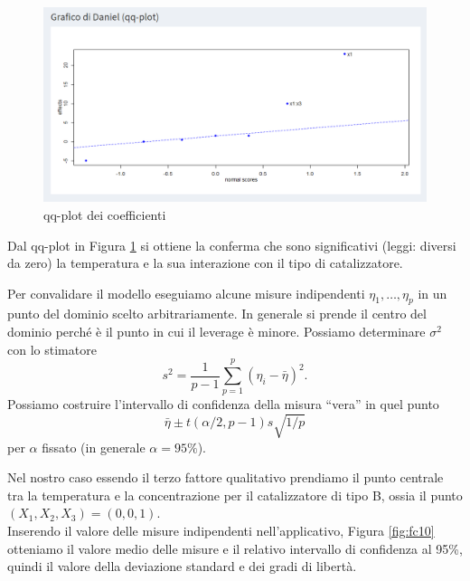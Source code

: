 \documentclass[
  11pt,
]{book}
\begin{document}
\begin{figure}

{\centering \includegraphics[width=1\linewidth]{Immagini/Fatt_compl/09_qqplot} 

}

\caption{qq-plot dei coefficienti}\label{fig:fc9}
\end{figure}

Dal qq-plot in Figura \ref{fig:fc9} si ottiene la conferma che sono
significativi (leggi: diversi da zero) la temperatura e la sua
interazione con il tipo di catalizzatore.

Per convalidare il modello eseguiamo alcune misure indipendenti
\(\eta_1,\dots,\eta_p\) in un punto del dominio scelto arbitrariamente. In
generale si prende il centro del dominio perché è il punto in cui il
leverage è minore. Possiamo determinare \(\sigma^2\) con lo stimatore \[
s^2=\frac{1}{p-1}\sum_{p=1}^p(\eta_i-\bar{\eta})^2.
\] Possiamo costruire l'intervallo di confidenza della misura ``vera'' in
quel punto \[
\bar{\eta}\pm t(\alpha/2,p-1)s\sqrt{1/p}
\] per \(\alpha\) fissato (in generale \(\alpha=95\%\)).

Nel nostro caso essendo il terzo fattore qualitativo prendiamo il punto
centrale tra la temperatura e la concentrazione per il catalizzatore di
tipo B, ossia il punto \((X_1,X_2,X_3)=(0,0,1)\).\\
Inserendo il valore delle misure indipendenti nell'applicativo,
Figura \ref{fig:fc10} otteniamo il valore medio delle misure e il relativo
intervallo di confidenza al 95\%, quindi il valore della deviazione
standard e dei gradi di libertà.
\end{document}
